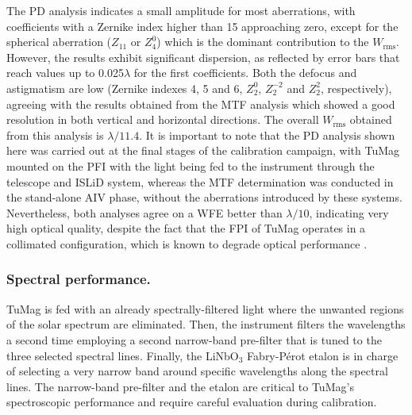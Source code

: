 The PD analysis indicates a small amplitude for most aberrations, with coefficients with a Zernike index higher than 15 approaching zero, except for the spherical aberration ($Z_{11}$ or $Z_4 ^0$) which is the dominant contribution to the $W_{\text{rms}}$. However, the results exhibit significant dispersion, as reflected by error bars that reach values up to 0.025$\lambda$ for the first coefficients. Both the defocus and astigmatism are low (Zernike indexes 4, 5 and 6, $Z _ 2 ^0$, $Z _ 2 ^{-2}$ and $Z _ 2 ^2$, respectively), agreeing with the results obtained from the MTF analysis which showed a good resolution in both vertical and horizontal directions. The overall $W_{\text{rms}}$ obtained from this analysis is $\lambda / 11.4$. It is important to note that the PD analysis shown here was carried out at the final stages of the calibration campaign, with TuMag mounted on the PFI with the light being fed to the instrument through the telescope and ISLiD system, whereas the MTF determination was conducted in the stand-alone AIV phase, without the aberrations introduced by these systems. Nevertheless, both analyses agree on a WFE better than $\lambda / 10$, indicating very high optical quality, despite the fact that the FPI of TuMag operates in a collimated configuration, which is known to degrade optical performance \citep{ghosts-etalon}.

\subsubsection{Spectral performance.}

TuMag is fed with an already spectrally-filtered light where the unwanted regions of the solar spectrum are eliminated.  Then, the instrument filters the wavelengths a second time employing a second narrow-band pre-filter that is tuned to the three selected spectral lines. Finally, the LiNbO$_3$ Fabry-Pérot etalon is in charge of selecting a very narrow band around specific wavelengths along the spectral lines. The narrow-band pre-filter and the etalon are critical to TuMag's spectroscopic performance and require careful evaluation during calibration.

